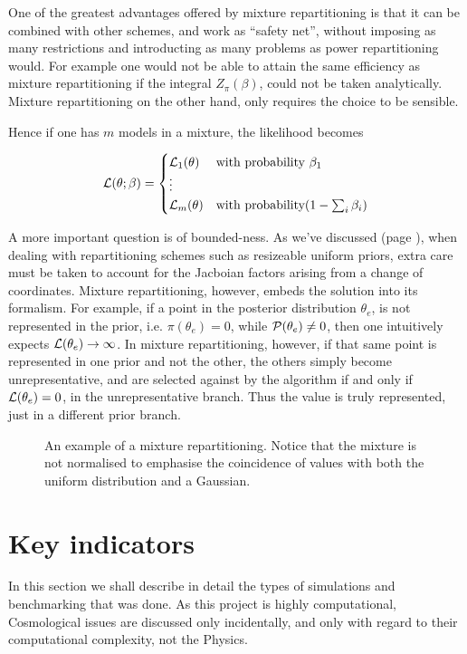 \documentclass[usenatbib]{mnras}
\begin{document}
One of the greatest advantages offered by mixture repartitioning
is that it can be combined with other schemes, and work as
``safety net'', without imposing as many restrictions and
introducting as many problems as power repartitioning would. For
example one would not be able to attain the same efficiency as
mixture repartitioning if the integral \(Z_{\pi}(\beta)\), could not
be taken analytically. Mixture repartitioning on the other hand,
only requires the choice to be sensible.

Hence if one has \(m\) models in a mixture, the likelihood becomes 

\begin{equation}
  {\cal L}(\theta; \beta)  = \begin{cases}
	{\cal L}_{1}(\theta) & \text{with probability } \beta_{1}\\
    \vdots\\
	{\cal L}_{m}(\theta) & \text{with probability} (1- \sum_{i}\beta_{i})
	\end{cases}
\end{equation}


A more important question is of bounded-ness. As we've discussed
(page \pageref{domain-discussion}), when dealing with repartitioning
schemes such as resizeable uniform priors, extra care must be
taken to account for the Jacboian factors arising from a change of
coordinates. Mixture repartitioning, however, embeds the solution
into its formalism. For example, if a point in the posterior
distribution \(\theta_{e}\), is not represented in the prior, i.e.
\(\pi(\theta_{e}) = 0\), while \({\cal P}(\theta_{e}) \ne 0\), then
one intuitively expects \({\cal L}(\theta_{e}) \rightarrow
	\infty\). In mixture repartitioning, however, if that same point is
represented in one prior and not the other, the others simply
become unrepresentative, and are selected against by the algorithm
if and only if \({\cal L}(\theta_{e}) = 0\), in the unrepresentative
branch. Thus the value is truly represented, just in a different
prior branch.

\begin{figure}
 
\caption{\label{orga504aba}
An example of a mixture repartitioning. Notice that the mixture is not normalised to emphasise the coincidence of values with both the uniform distribution and a Gaussian.}
\end{figure}



\section{Key indicators}
\label{sec:org100d73d}
In this section we shall describe in detail the types of simulations
and benchmarking that was done. As this project is highly
computational, Cosmological issues are discussed only incidentally,
and only with regard to their computational complexity, not the
Physics.
\end{document}

